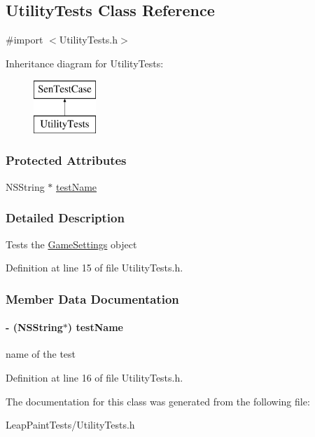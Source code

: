 \hypertarget{interface_utility_tests}{\subsection{Utility\-Tests Class Reference}
\label{dc/d82/interface_utility_tests}
}


{\ttfamily \#import $<$Utility\-Tests.\-h$>$}

Inheritance diagram for Utility\-Tests\-:\begin{figure}[H]
\begin{center}
\leavevmode
\includegraphics[height=2.000000cm]{dc/d82/interface_utility_tests}
\end{center}
\end{figure}
\subsubsection*{Protected Attributes}
\begin{DoxyCompactItemize}
\item 
N\-S\-String $\ast$ \hyperlink{interface_utility_tests_a0d3c1bf9a3bb4676bcf18650af0168d8}{test\-Name}
\end{DoxyCompactItemize}


\subsubsection{Detailed Description}
Tests the \hyperlink{interface_game_settings}{Game\-Settings} object 

Definition at line 15 of file Utility\-Tests.\-h.



\subsubsection{Member Data Documentation}
\hypertarget{interface_utility_tests_a0d3c1bf9a3bb4676bcf18650af0168d8}{
\paragraph[{test\-Name}]{\setlength{\rightskip}{0pt plus 5cm}-\/ (N\-S\-String$\ast$) test\-Name\hspace{0.3cm}{\ttfamily [protected]}}}\label{dc/d82/interface_utility_tests_a0d3c1bf9a3bb4676bcf18650af0168d8}
name of the test 

Definition at line 16 of file Utility\-Tests.\-h.



The documentation for this class was generated from the following file\-:\begin{DoxyCompactItemize}
\item 
Leap\-Paint\-Tests/Utility\-Tests.\-h\end{DoxyCompactItemize}
